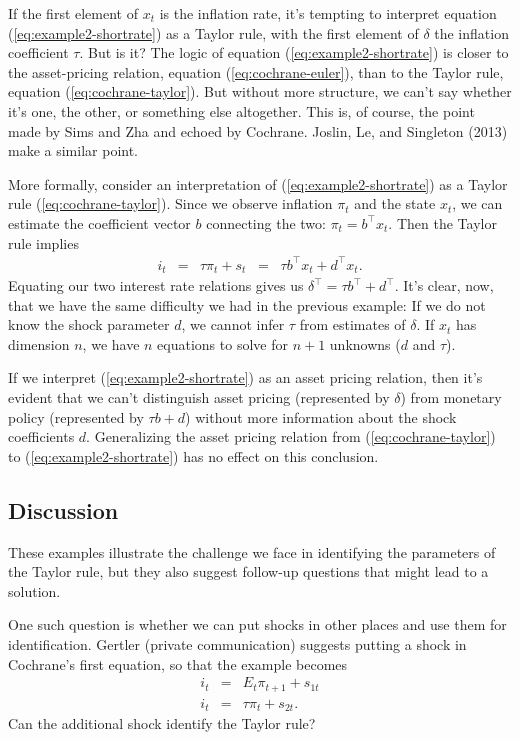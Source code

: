 \documentclass[12pt]{article}
\begin{document}
{If the first element of $x_t$ is the inflation rate,
it's tempting to interpret equation (\ref{eq:example2-shortrate}) as a Taylor rule,
with the first element of $\delta$ the inflation coefficient $\tau$.
But is it?
The logic of equation (\ref{eq:example2-shortrate})
is closer to the asset-pricing relation, equation (\ref{eq:cochrane-euler}),
than to the Taylor rule, equation (\ref{eq:cochrane-taylor}).
But without more structure, we can't say whether it's one, the other,
or something else altogether.
This is, of course, the point made by Sims and Zha
and echoed by Cochrane.
Joslin, Le, and Singleton (2013) make a similar point.

More formally, consider an interpretation
of (\ref{eq:example2-shortrate}) as a Taylor rule (\ref{eq:cochrane-taylor}).
Since we observe inflation $\pi_t$ and the state $x_t$,
we can estimate the coefficient vector $b$ connecting the two:  $\pi_t = b^\top x_t$.
Then the Taylor rule implies
\begin{eqnarray*}
    i_t &=& \tau \pi_t + s_t
        \;\;=\;\; \tau b^\top x_t + d^\top x_t .
\end{eqnarray*}
Equating our two interest rate relations gives us
$\delta^\top = \tau b^\top + d^\top$.
It's clear, now, that we have the same difficulty we had in the previous example:
If we do not know the shock parameter $d$,
we cannot infer $\tau$ from estimates of $\delta$.
If $x_t$ has dimension $n$, we have $n$ equations to solve for
$n+1$ unknowns ($d$ and $\tau$).

If we interpret (\ref{eq:example2-shortrate}) as an asset pricing relation,
then it's evident that we can't distinguish asset pricing (represented by $\delta$)
from monetary policy (represented by $\tau b + d $) without more information
about the shock coefficients $d$.
Generalizing the asset pricing relation from (\ref{eq:cochrane-taylor})
to (\ref{eq:example2-shortrate}) has no effect on this conclusion.


\subsection{Discussion}
\label{sec:examples-discussion}

These examples illustrate the challenge we face in identifying the parameters
of the Taylor rule,
but they also suggest follow-up questions that might lead to a solution.

One such question is whether we can put shocks in other places
and use them for identification.
Gertler (private communication) suggests putting a shock
in Cochrane's first equation, so that the example becomes
\begin{eqnarray*}
    i_t &=& E_t \pi_{t+1} + s_{1t} \\
    i_t &=& \tau \pi_t + s_{2t} .
\end{eqnarray*}
Can the additional shock identify the Taylor rule?

}
\end{document}
